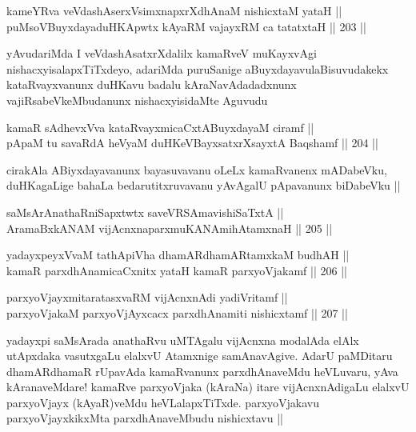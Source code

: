 
\begin{shl}
kameYRva veVdashAserxV\s simxnapxrXdhAnaM nishicxtaM yataH || \\
puMsoV\s BuyxdayaduHKApwtx kAyaRM vajayxRM ca tatatxtaH ||  203 ||  
\end{shl}

\begin{artha}
yAvudariMda I veVdashAsatxrXdalilx kamaRveV muKayxvAgi
nishacxyisalapxTiTxdeyo, adariMda puruSanige aBuyxdayavulaBisuvudakekx
kataRvayxvanunx duHKavu badalu kAraNavAdadadxnunx
vajiRsabeVkeMbudanunx nishacxyisidaMte Aguvudu
\end{artha}

\begin{shl}
kamaR sAdhevxVva kataRvayxmicaCxtA\s BuyxdayaM ciramf || \\
pApaM tu savaRdA heVyaM duHKeVBayxsatxrXsayxtA Baqshamf ||  204 ||  
\end{shl}

\begin{artha}
cirakAla ABiyxdayavanunx bayasuvavanu oLeLx kamaRvanenx mADabeVku,
duHKagaLige bahaLa bedarutitxruvavanu yAvAgalU pApavanunx biDabeVku ||
\end{artha}


\begin{shl}
saMsArAnathaRniSapxtwtx saveVRSAmavishiSaTxtA || \\
AramaBxkANAM vijAcnxnaparxmuKANAmihA\s \s tamxnaH ||  205 ||  
\end{shl}
				
\begin{shl}
yadayxpeyxVvaM tathA\s piVha dhamARdhamARtamxkaM budhAH || \\
kamaR parxdhAnamicaCxnitx yataH kamaR parxyoVjakamf ||  206 ||  
\end{shl}
				
\begin{shl}
parxyoVjayxmitaratasxvaRM vijAcnxnAdi yadiVritamf ||  \\
parxyoVjakaM parxyoVjAyxcacx parxdhAnamiti nishicxtamf ||  207 ||  
\end{shl}

\begin{artha}
yadayxpi saMsArada anathaRvu uMTAgalu vijAcnxna modalAda elAlx
utApxdaka vasutxgaLu elalxvU Atamxnige samAnavAgive. AdarU paMDitaru
dhamARdhamaR rUpavAda kamaRvanunx parxdhAnaveMdu heVLuvaru, yAva
kAranaveMdare! kamaRve parxyoVjaka (kAraNa) itare vijAcnxnAdigaLu
elalxvU parxyoVjayx (kAyaR)veMdu heVLalapxTiTxde. parxyoVjakavu
parxyoVjayxkikxMta parxdhAnaveMbudu nishicxtavu ||
\end{artha}

